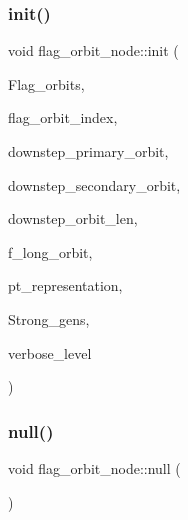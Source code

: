 \mbox{\label{classflag__orbit__node_ada76817a0bfc8cc9d5db35172408d646}} 
\subsubsection{\texorpdfstring{init()}{init()}}
{\footnotesize\ttfamily void flag\+\_\+orbit\+\_\+node\+::init (\begin{DoxyParamCaption}\item[{\mbox{\hyperlink{classflag__orbits}{flag\+\_\+orbits}} $\ast$}]{Flag\+\_\+orbits,  }\item[{\mbox{\hyperlink{galois_8h_a09fddde158a3a20bd2dcadb609de11dc}{I\+NT}}}]{flag\+\_\+orbit\+\_\+index,  }\item[{\mbox{\hyperlink{galois_8h_a09fddde158a3a20bd2dcadb609de11dc}{I\+NT}}}]{downstep\+\_\+primary\+\_\+orbit,  }\item[{\mbox{\hyperlink{galois_8h_a09fddde158a3a20bd2dcadb609de11dc}{I\+NT}}}]{downstep\+\_\+secondary\+\_\+orbit,  }\item[{\mbox{\hyperlink{galois_8h_a09fddde158a3a20bd2dcadb609de11dc}{I\+NT}}}]{downstep\+\_\+orbit\+\_\+len,  }\item[{\mbox{\hyperlink{galois_8h_a09fddde158a3a20bd2dcadb609de11dc}{I\+NT}}}]{f\+\_\+long\+\_\+orbit,  }\item[{\mbox{\hyperlink{galois_8h_a09fddde158a3a20bd2dcadb609de11dc}{I\+NT}} $\ast$}]{pt\+\_\+representation,  }\item[{\mbox{\hyperlink{classstrong__generators}{strong\+\_\+generators}} $\ast$}]{Strong\+\_\+gens,  }\item[{\mbox{\hyperlink{galois_8h_a09fddde158a3a20bd2dcadb609de11dc}{I\+NT}}}]{verbose\+\_\+level }\end{DoxyParamCaption})}

\mbox{\label{classflag__orbit__node_a5f01a74db4cb9fe9d0e44f2e879280b3}} 
\subsubsection{\texorpdfstring{null()}{null()}}
{\footnotesize\ttfamily void flag\+\_\+orbit\+\_\+node\+::null (\begin{DoxyParamCaption}{ }\end{DoxyParamCaption})}

